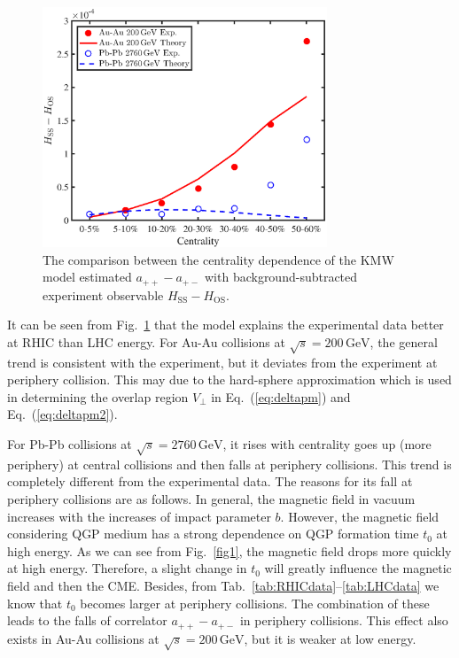 \documentclass[preprint]{elsarticle}
\begin{document}
\begin{figure}
\centering
\includegraphics[width=8.5cm]{fig3.eps}
\caption{\label{fig3}The comparison between the centrality dependence of the KMW model estimated $a_{++}-a_{+-}$ with background-subtracted experiment observable $H_\text{SS} - H_\text{OS}$.}
\end{figure}

It can be seen from Fig.~\ref{fig3} that the model explains the experimental data better at RHIC than LHC energy. For Au-Au collisions at $\sqrt{s} = 200\,\mathrm{GeV}$, the general trend is consistent with the experiment, but it deviates from the experiment at periphery collision. This may due to the hard-sphere approximation which is used in determining the overlap region $V_\perp$ in Eq.~(\ref{eq:deltapm}) and Eq.~(\ref{eq:deltapm2}).

For Pb-Pb collisions at $\sqrt{s} = 2760\,\mathrm{GeV}$, it rises with centrality goes up (more periphery) at central collisions and then falls at periphery collisions. This trend is completely different from the experimental data. The reasons for its fall at periphery collisions are as follows. In general, the magnetic field in vacuum increases with the increases of impact parameter $b$. However, the magnetic field considering QGP medium has a strong dependence on QGP formation time $t_0$ at high energy. As we can see from Fig.~\ref{fig1}, the magnetic field drops more quickly at high energy. Therefore, a slight change in $t_0$ will greatly influence the magnetic field and then the CME. Besides, from Tab.~\ref{tab:RHICdata}--\ref{tab:LHCdata} we know that $t_0$ becomes larger at periphery collisions. The combination of these leads to the falls of correlator $a_{++} - a_{+-}$ in periphery collisions. This effect also exists in Au-Au collisions at $\sqrt{s} = 200\,\mathrm{GeV}$, but it is weaker at low energy.
\end{document}
